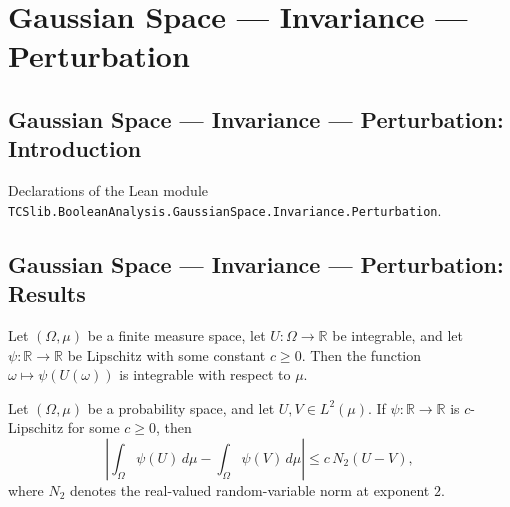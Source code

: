 \section{Gaussian Space --- Invariance --- Perturbation}
\subsection*{Gaussian Space --- Invariance --- Perturbation: Introduction}

Declarations of the Lean module \texttt{TCSlib.BooleanAnalysis.GaussianSpace.Invariance.Perturbation}.

\subsection*{Gaussian Space --- Invariance --- Perturbation: Results}

\begin{theorem}
\label{BooleanAnalysis.GaussianSpace.Invariance.integrable_lipschitz_comp}
\leanok
{}
Let $(\Omega,\mu)$ be a finite measure space, let $U:\Omega\to\mathbb R$ be integrable,
and let $\psi:\mathbb R\to\mathbb R$ be Lipschitz with some constant $c\ge 0$. Then the
function $\omega\mapsto\psi(U(\omega))$ is integrable with respect to $\mu$.
\end{theorem}

\begin{theorem}
\label{BooleanAnalysis.GaussianSpace.Invariance.lipschitz_integral_sub_le_two_norm}
\leanok
{}
Let $(\Omega,\mu)$ be a probability space, and let $U,V\in L^2(\mu)$. If $\psi:\mathbb
R\to\mathbb R$ is $c$-Lipschitz for some $c\ge0$, then
\[
\left|\int_\Omega\psi(U)\,d\mu-\int_\Omega\psi(V)\,d\mu\right|\le c\,N_2(U-V),
\]
where $N_2$ denotes the real-valued random-variable norm at exponent $2$.
\end{theorem}

